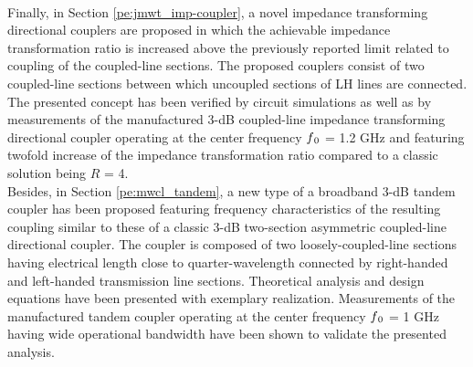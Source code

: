 \\
\indent Finally, in Section \ref{pe:jmwt_imp-coupler}, a novel impedance transforming directional couplers are proposed in which the achievable impedance transformation ratio is increased above the previously reported limit related to coupling of the coupled-line sections. The proposed couplers consist of two coupled-line sections between which uncoupled sections of LH lines are connected. The presented concept has been verified by circuit simulations as well as by measurements of the manufactured 3-dB coupled-line impedance transforming directional coupler operating at the center frequency $f\textsubscript{0}$ = 1.2 GHz and featuring twofold increase of the impedance transformation ratio compared to a classic solution being $R$ = 4.
\\
\indent Besides, in Section \ref{pe:mwcl_tandem}, a new type of a broadband 3-dB tandem coupler has been proposed featuring frequency characteristics of the resulting coupling similar to these of a classic 3-dB two-section asymmetric coupled-line directional coupler. The coupler is composed of two loosely-coupled-line sections having electrical length close to quarter-wavelength connected by right-handed and left-handed transmission line sections. Theoretical analysis and design equations have been presented with exemplary realization. Measurements of the manufactured tandem coupler operating at the center frequency $f\textsubscript{0}$ = 1 GHz having wide operational bandwidth have been shown to validate the presented analysis.

\cleardoublepage



\cleardoublepage



\cleardoublepage



\cleardoublepage




